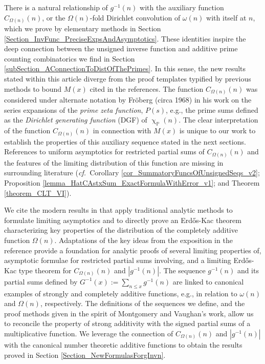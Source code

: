 \documentclass[11pt,reqno,a4letter]{article}
\numberwithin{figure}{section}
\numberwithin{table}{section}
\newcommand{\cf}{\textit{cf.\ }}
\renewcommand{\chi}{\upchi}
\theoremstyle{plain}
\numberwithin{theorem}{section}
\theoremstyle{definition}
\begin{document}
There is a natural relationship of $g^{-1}(n)$ with the auxiliary function 
$C_{\Omega(n)}(n)$, or the $\Omega(n)$-fold Dirichlet convolution of $\omega(n)$ 
with itself at $n$, which we prove by elementary methods in 
Section \ref{Section_InvFunc_PreciseExpsAndAsymptotics}. 
These identities inspire the deep connection between the 
unsigned inverse function and additive prime counting combinatorics we find in 
Section \ref{subSection_AConnectionToDistOfThePrimes}. 
In this sense, the new results stated within this article diverge from the proof 
templates typified by previous methods to bound $M(x)$ cited in the references. 
The function $C_{\Omega(n)}(n)$ was considered under alternate notation 
by Fr\"oberg (circa 1968) in his work on the series expansions of the 
\emph{prime zeta function}, $P(s)$, 
e.g., the prime sums defined as the 
\emph{Dirichlet generating function} (DGF) of $\chi_{\mathbb{P}}(n)$. 
The clear interpretation of the function $C_{\Omega(n)}(n)$ in connection with $M(x)$ 
is unique to our work to establish the 
properties of this auxiliary sequence stated in the next sections. 
References to uniform asymptotics for restricted partial sums of 
$C_{\Omega(n)}(n)$ and the features of the limiting distribution 
of this function are missing in surrounding literature 
(\cf Corollary \ref{cor_SummatoryFuncsOfUnsignedSeqs_v2}; 
Proposition \ref{lemma_HatCAstxSum_ExactFormulaWithError_v1}; and 
Theorem \ref{theorem_CLT_VI}). 

We cite the modern results in \cite[\S 7.4; \S 2.4]{MV} 
that apply traditional analytic methods to formulate limiting asymptotics and to 
directly prove an Erd\H{o}s-Kac theorem characterizing key properties of the 
distribution of the completely additive 
function $\Omega(n)$. Adaptations of the key ideas 
from the exposition in the reference 
provide a foundation for analytic proofs of several limiting 
properties of, asymptotic formulae for restricted partial sums involving, and a 
limiting Erd\H{o}s-Kac type theorem for 
$C_{\Omega(n)}(n)$ and $|g^{-1}(n)|$. 
The sequence $g^{-1}(n)$ and its partial sums defined by 
$G^{-1}(x) := \sum_{n \leq x} g^{-1}(n)$ are linked to 
canonical examples of strongly and completely additive functions, 
e.g., in relation to $\omega(n)$ and $\Omega(n)$, respectively. 
The definitions of the sequences we define, and the 
proof methods given in the spirit of Montgomery and Vaughan's work, 
allow us to reconcile the property of strong additivity with the signed 
partial sums of a multiplicative function. 
We leverage the connection of $C_{\Omega(n)}(n)$ and $|g^{-1}(n)|$ with the 
canonical number theoretic additive functions to obtain the results proved 
in Section \ref{Section_NewFormulasForgInvn}. 
\end{document}
